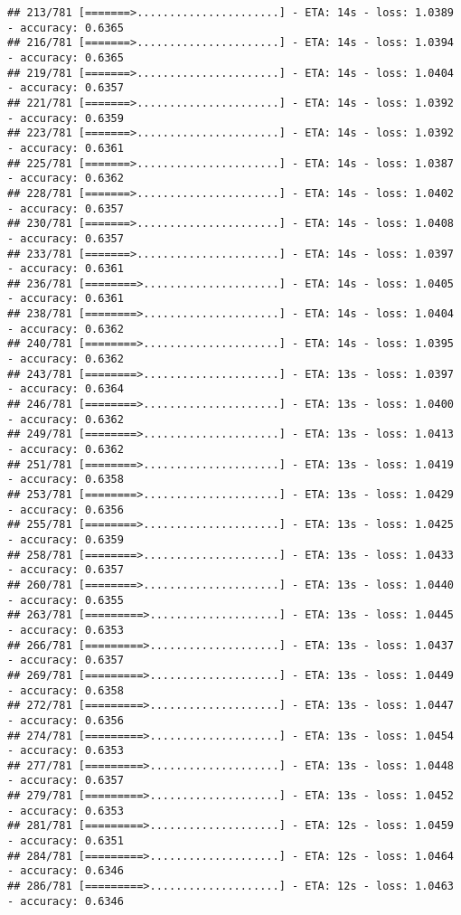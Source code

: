 \documentclass[
]{article}
\begin{document}
\begin{verbatim}
## 213/781 [=======>......................] - ETA: 14s - loss: 1.0389 - accuracy: 0.6365
## 216/781 [=======>......................] - ETA: 14s - loss: 1.0394 - accuracy: 0.6365
## 219/781 [=======>......................] - ETA: 14s - loss: 1.0404 - accuracy: 0.6357
## 221/781 [=======>......................] - ETA: 14s - loss: 1.0392 - accuracy: 0.6359
## 223/781 [=======>......................] - ETA: 14s - loss: 1.0392 - accuracy: 0.6361
## 225/781 [=======>......................] - ETA: 14s - loss: 1.0387 - accuracy: 0.6362
## 228/781 [=======>......................] - ETA: 14s - loss: 1.0402 - accuracy: 0.6357
## 230/781 [=======>......................] - ETA: 14s - loss: 1.0408 - accuracy: 0.6357
## 233/781 [=======>......................] - ETA: 14s - loss: 1.0397 - accuracy: 0.6361
## 236/781 [========>.....................] - ETA: 14s - loss: 1.0405 - accuracy: 0.6361
## 238/781 [========>.....................] - ETA: 14s - loss: 1.0404 - accuracy: 0.6362
## 240/781 [========>.....................] - ETA: 14s - loss: 1.0395 - accuracy: 0.6362
## 243/781 [========>.....................] - ETA: 13s - loss: 1.0397 - accuracy: 0.6364
## 246/781 [========>.....................] - ETA: 13s - loss: 1.0400 - accuracy: 0.6362
## 249/781 [========>.....................] - ETA: 13s - loss: 1.0413 - accuracy: 0.6362
## 251/781 [========>.....................] - ETA: 13s - loss: 1.0419 - accuracy: 0.6358
## 253/781 [========>.....................] - ETA: 13s - loss: 1.0429 - accuracy: 0.6356
## 255/781 [========>.....................] - ETA: 13s - loss: 1.0425 - accuracy: 0.6359
## 258/781 [========>.....................] - ETA: 13s - loss: 1.0433 - accuracy: 0.6357
## 260/781 [========>.....................] - ETA: 13s - loss: 1.0440 - accuracy: 0.6355
## 263/781 [=========>....................] - ETA: 13s - loss: 1.0445 - accuracy: 0.6353
## 266/781 [=========>....................] - ETA: 13s - loss: 1.0437 - accuracy: 0.6357
## 269/781 [=========>....................] - ETA: 13s - loss: 1.0449 - accuracy: 0.6358
## 272/781 [=========>....................] - ETA: 13s - loss: 1.0447 - accuracy: 0.6356
## 274/781 [=========>....................] - ETA: 13s - loss: 1.0454 - accuracy: 0.6353
## 277/781 [=========>....................] - ETA: 13s - loss: 1.0448 - accuracy: 0.6357
## 279/781 [=========>....................] - ETA: 13s - loss: 1.0452 - accuracy: 0.6353
## 281/781 [=========>....................] - ETA: 12s - loss: 1.0459 - accuracy: 0.6351
## 284/781 [=========>....................] - ETA: 12s - loss: 1.0464 - accuracy: 0.6346
## 286/781 [=========>....................] - ETA: 12s - loss: 1.0463 - accuracy: 0.6346

\end{verbatim}
\end{document}
